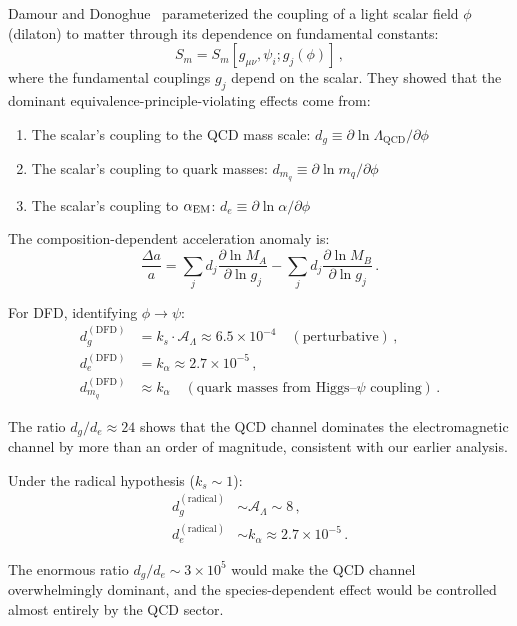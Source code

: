 \documentclass[aps,prd,twocolumn,superscriptaddress,floatfix,nofootinbib]{revtex4-2}
\newcommand{\LQCD}{\Lambda_{\mathrm{QCD}}}
\begin{document}
Damour and Donoghue~\cite{Damour2010} parameterized the coupling of a light
scalar field $\phi$ (dilaton) to matter through its dependence on fundamental
constants:
\begin{equation}
S_m = S_m[g_{\mu\nu}, \psi_i; g_j(\phi)] \, ,
\end{equation}
where the fundamental couplings $g_j$ depend on the scalar. They showed that the
dominant equivalence-principle-violating effects come from:
\begin{enumerate}
\item The scalar's coupling to the QCD mass scale: $d_g \equiv
\partial\ln\LQCD / \partial\phi$
\item The scalar's coupling to quark masses: $d_{m_q} \equiv
\partial\ln m_q / \partial\phi$
\item The scalar's coupling to $\alpha_{\rm EM}$: $d_e \equiv
\partial\ln\alpha / \partial\phi$
\end{enumerate}

The composition-dependent acceleration anomaly is:
\begin{equation}
\frac{\Delta a}{a} = \sum_j d_j \frac{\partial\ln M_A}{\partial\ln g_j} -
\sum_j d_j \frac{\partial\ln M_B}{\partial\ln g_j} \, .
\end{equation}

For DFD, identifying $\phi \to \psi$:
\begin{align}
d_g^{(\mathrm{DFD})} &= k_s \cdot \mathcal{A}_\Lambda \approx 6.5 \times 10^{-4}
\quad (\text{perturbative}) \, , \\
d_e^{(\mathrm{DFD})} &= k_\alpha \approx 2.7 \times 10^{-5} \, , \\
d_{m_q}^{(\mathrm{DFD})} &\approx k_\alpha \quad (\text{quark masses from Higgs--$\psi$ coupling}) \, .
\end{align}

The ratio $d_g / d_e \approx 24$ shows that the QCD channel dominates the
electromagnetic channel by more than an order of magnitude, consistent with our
earlier analysis.

Under the radical hypothesis ($k_s \sim 1$):
\begin{align}
d_g^{(\mathrm{radical})} &\sim \mathcal{A}_\Lambda \sim 8 \, , \\
d_e^{(\mathrm{radical})} &\sim k_\alpha \approx 2.7 \times 10^{-5} \, .
\end{align}

The enormous ratio $d_g/d_e \sim 3 \times 10^5$ would make the QCD channel
overwhelmingly dominant, and the species-dependent effect would be controlled
almost entirely by the QCD sector.
\end{document}

